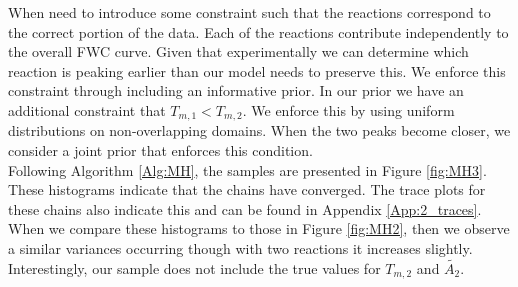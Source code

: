 When need to introduce some constraint such that the reactions correspond to the correct portion of the data. Each of the reactions contribute independently to the overall FWC curve. Given that experimentally we can determine which reaction is peaking earlier than our model needs to preserve this. We enforce this constraint through including an informative prior. In our prior we have an additional constraint that $T_{m,1}<T_{m,2}$. We enforce this by using uniform distributions on non-overlapping domains. When the two peaks become closer, we consider a joint prior that enforces this condition.\\

Following Algorithm \ref{Alg:MH}, the samples are presented in Figure \ref{fig:MH3}. These histograms indicate that the chains have converged. The trace plots for these chains also indicate this and can be found in Appendix \ref{App:2_traces}. When we compare these histograms to those in Figure \ref{fig:MH2}, then we observe a similar variances occurring though with two reactions it increases slightly. Interestingly, our sample does not include the true values for $T_{m,2}$ and $\tilde{A_2}$.\\

